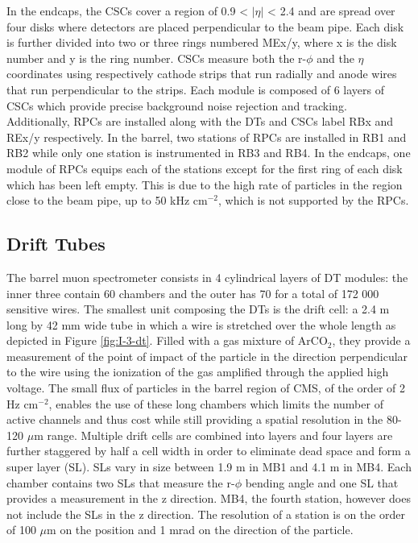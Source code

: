    In the endcaps, the CSCs cover a region of 0.9 < $ | \eta | $ < 2.4 and are spread over four disks where detectors are placed perpendicular to the beam pipe. Each disk is further divided into two or three rings numbered MEx/y, where x is the disk number and y is the ring number. CSCs measure both the r-$\phi$ and the $ \eta $ coordinates using respectively cathode strips that run radially and anode wires that run perpendicular to the strips. Each module is composed of 6 layers of CSCs which provide precise background noise rejection and tracking. \\

    Additionally, RPCs are installed along with the DTs and CSCs label RBx and REx/y respectively. In the barrel, two stations of RPCs are installed in RB1 and RB2 while only one station is instrumented in RB3 and RB4. In the endcaps, one module of RPCs equips each of the stations except for the first ring of each disk which has been left empty. This is due to the high rate of particles in the region close to the beam pipe, up to 50 kHz cm$^{-2}$, which is not supported by the RPCs.

    \subsection{Drift Tubes}

      The barrel muon spectrometer consists in 4 cylindrical layers of DT modules: the inner three contain 60 chambers and the outer has 70 for a total of 172 000 sensitive wires. The smallest unit composing the DTs is the drift cell: a 2.4 m long by 42 mm wide tube in which a wire is stretched over the whole length as depicted in Figure \ref{fig:I-3-dt}. Filled with a gas mixture of ArCO$_2$, they provide a measurement of the point of impact of the particle in the direction perpendicular to the wire using the ionization of the gas amplified through the applied high voltage. The small flux of particles in the barrel region of CMS, of the order of 2 Hz cm$^{-2}$, enables the use of these long chambers which limits the number of active channels and thus cost while still providing a spatial resolution in the 80-120 $\mu$m range. Multiple drift cells are combined into layers and four layers are further staggered by half a cell width in order to eliminate dead space and form a super layer (SL). SLs vary in size between 1.9 m in MB1 and 4.1 m in MB4. Each chamber contains two SLs that measure the r-$\phi$ bending angle and one SL that provides a measurement in the z direction. MB4, the fourth station, however does not include the SLs in the z direction. The resolution of a station is on the order of 100 $\mu$m on the position and 1 mrad on the direction of the particle. \\

